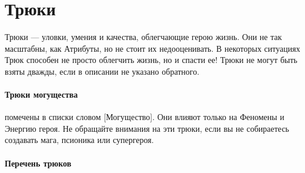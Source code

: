 \section{Трюки}
Трюки — уловки, умения и качества, облегчающие герою жизнь. Они не так масштабны, как Атрибуты, но не стоит их недооценивать. В некоторых ситуациях Трюк способен не просто облегчить жизнь, но и спасти ее! Трюки не могут быть взяты дважды, если в описании не указано обратного.
\paragraph{Трюки могущества} помечены в списки словом [Могущество]. Они влияют только на Феномены и Энергию героя. Не обращайте внимания на эти трюки, если вы не собираетесь создавать мага, псионика или супергероя.

\paragraph{Перечень трюков}
